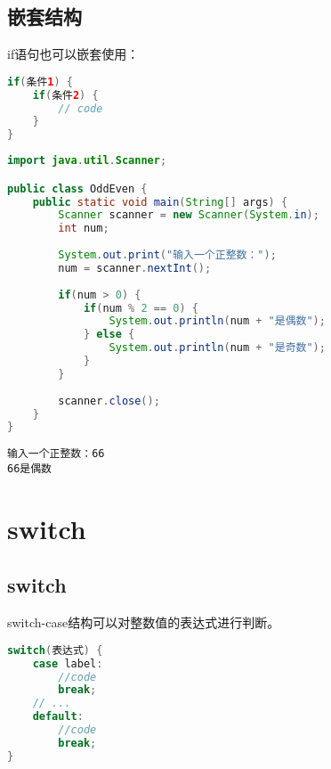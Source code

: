 \vspace{0.5cm}

\subsection{嵌套结构}

if语句也可以嵌套使用：

\vspace{-0.5cm}

\begin{lstlisting}[language=Java]
if(条件1) {
	if(条件2) {
		// code
	}
}
\end{lstlisting}

\vspace{0.5cm}


\begin{lstlisting}[language=Java]
import java.util.Scanner;

public class OddEven {
	public static void main(String[] args) {
		Scanner scanner = new Scanner(System.in);
		int num;
		
		System.out.print("输入一个正整数：");
		num = scanner.nextInt();
		
		if(num > 0) {
			if(num % 2 == 0) {
				System.out.println(num + "是偶数");
			} else {
				System.out.println(num + "是奇数");
			}
		}
		
		scanner.close();
	}
}
\end{lstlisting}

\begin{tcolorbox}
	\begin{verbatim}
输入一个正整数：66
66是偶数
	\end{verbatim}
\end{tcolorbox}

\newpage

\section{switch}

\subsection{switch}

switch-case结构可以对整数值的表达式进行判断。

\vspace{-0.5cm}

\begin{lstlisting}[language=Java]
switch(表达式) {
    case label:
        //code
        break;
    // ...
    default:
        //code
        break;
}
\end{lstlisting}

